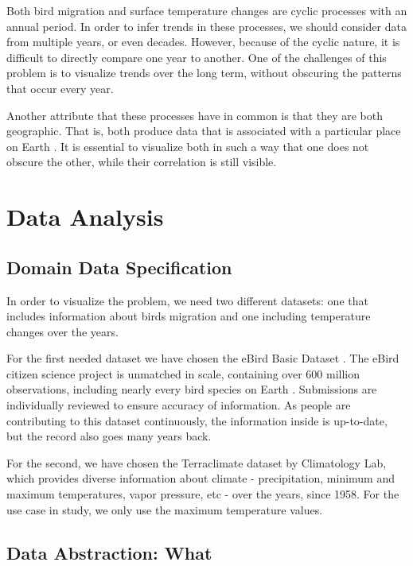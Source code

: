\documentclass[journal]{vgtc}                %
\begin{document}
Both bird migration and surface temperature changes are cyclic processes with an annual period. In order to infer trends in these processes, we should consider data from multiple years, or even decades. However, because of the cyclic nature, it is difficult to directly compare one year to another. One of the challenges of this problem is to visualize trends over the long term, without obscuring the patterns that occur every year.

Another attribute that these processes have in common is that they are both geographic. That is, both produce data that is associated with a particular place on Earth \cite{iso2014geo}. It is essential to visualize both in such a way that one does not obscure the other, while their correlation is still visible.

\section{Data Analysis}

\subsection{Domain Data Specification}


In order to visualize the problem, we need two different datasets: one that includes information about birds migration and one including temperature changes over the years.

For the first needed dataset we have chosen the eBird Basic Dataset \cite{ebird2020data}. The eBird citizen science project is unmatched in scale, containing over 600 million observations, including nearly every bird species on Earth \cite{strimas2020ebird}. Submissions are individually reviewed to ensure accuracy of information. As people are contributing to this dataset continuously, the information inside is up-to-date, but the record also goes many years back.

For the second, we have chosen the Terraclimate dataset \cite{terraclimatedata} by Climatology Lab, which provides diverse information about climate - precipitation, minimum and maximum temperatures, vapor pressure, etc - over the years, since 1958. For the use case in study, we only use the maximum temperature values.

\subsection{Data Abstraction: What}
\end{document}
